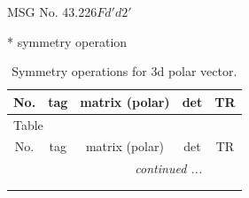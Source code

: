\documentclass[fleqn,8pt]{jsarticle}
\begin{document}
\setcounter{MaxMatrixCols}{32}

\renewcommand{\tablename}{Table~}
\renewcommand{\figurename}{Figure~}
\begin{center}
\LARGE
MSG No. 43.226\quad$Fd'd2'$
\end{center}
* symmetry operation
\renewcommand{\arraystretch}{1.3}
\begin{longtable}{ccccc}
\caption{Symmetry operations for 3d polar vector.}
 \\
 \hline \hline
No. & tag & matrix (polar) & det & TR \\ \hline \endfirsthead

\multicolumn{4}{l}{\tablename\ \thetable{}} \\
 \hline \hline
No. & tag & matrix (polar) & det & TR \\ \hline \endhead

 \hline \hline
\multicolumn{4}{r}{\footnotesize\it continued ...} \\ \endfoot

 \hline \hline
\multicolumn{4}{r}{} \\ \endlastfoot


\end{longtable}
\end{document}
